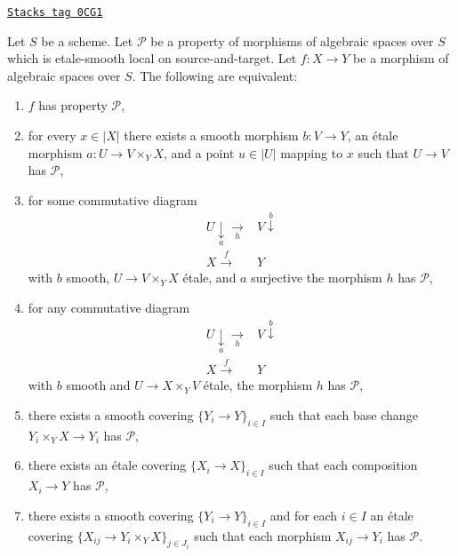 \begin{lemma}
\label{spaces-descent-lemma-etale-smooth-local-source-target-characterize}
\href{https://stacks.math.columbia.edu/tag/0CG1}{\texttt{Stacks tag 0CG1}}

Let $S$ be a scheme.
Let $\mathcal{P}$ be a property of morphisms of algebraic spaces over $S$
which is etale-smooth local on source-and-target.
Let $f : X \to Y$ be a morphism
of algebraic spaces over $S$. The following are equivalent:
\begin{enumerate}
\item[(a)] $f$ has property $\mathcal{P}$,
\item[(b)] for every $x \in |X|$ there exists a smooth morphism $b : V \to Y$,
an \'etale morphism $a : U \to V \times_Y X$, and a point $u \in |U|$
mapping to $x$ such that $U \to V$ has $\mathcal{P}$,
\item[(c)] for some commutative diagram
$$
\begin{array}{cc}U \underset{a}{\downarrow}\underset{h}{\longrightarrow} & V \overset{b}{\downarrow} \\ X \overset{f}{\longrightarrow} & Y\end{array}
$$
with $b$ smooth, $U \to V \times_Y X$ \'etale, and $a$ surjective
the morphism $h$ has $\mathcal{P}$,
\item[(d)] for any commutative diagram
$$
\begin{array}{cc}U \underset{a}{\downarrow}\underset{h}{\longrightarrow} & V \overset{b}{\downarrow} \\ X \overset{f}{\longrightarrow} & Y\end{array}
$$
with $b$ smooth and $U \to X \times_Y V$ \'etale, the morphism $h$
has $\mathcal{P}$,
\item[(e)] there exists a smooth covering $\{Y_i \to Y\}_{i \in I}$ such
that each base change $Y_i \times_Y X \to Y_i$ has $\mathcal{P}$,
\item[(f)] there exists an \'etale covering $\{X_i \to X\}_{i \in I}$ such
that each composition $X_i \to Y$ has $\mathcal{P}$,
\item[(g)] there exists a smooth covering $\{Y_i \to Y\}_{i \in I}$ and
for each $i \in I$ an \'etale covering
$\{X_{ij} \to Y_i \times_Y X\}_{j \in J_i}$ such that each morphism
$X_{ij} \to Y_i$ has $\mathcal{P}$.
\end{enumerate}
\end{lemma}

